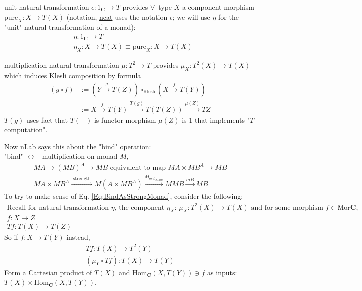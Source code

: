 \documentclass[10pt]{amsart}
\begin{document}
\begin{multicols*}{2}
unit natural transformation $\epsilon:1_{\mathbf{C}} \to T$ provides $\forall \,$ type $X$ a component morphism $\text{pure}_X :X \to T(X)$ (notation, \href{https://ncatlab.org/nlab/show/monad+%28in+computer+science%29}{ncat} uses the notation $\epsilon$; we will use $\eta$ for the "unit" natural transformation of a monad):
	\[
		\begin{aligned}
		&  \eta : 1_{\mathbf{C}} \to T \\ 
		& \eta_X : X\to T(X) \equiv \text{pure}_X : X \to T(X)
		\end{aligned}	
	\]

multiplication natural transformation $\mu :T^2 \to T$ provides $\mu_X : T^2(X) \to T(X)$ which induces Klesli composition by formula
\begin{equation}
\begin{aligned} 
	(g\circ f) & := (Y \xrightarrow{g} T(Z)) \circ_{\text{Klesli}} (X\xrightarrow{f} T(Y)) \\
	& := X \xrightarrow{f} T(Y) \xrightarrow{T(g)} T(T(Z)) \xrightarrow{ \mu(Z) } TZ
\end{aligned} 
\end{equation}
$T(g)$ uses fact that $T(-)$ is functor morphism $\mu(Z)$ is 1 that implements "$T$-computation".

Now \href{https://ncatlab.org/nlab/show/monad+%28in+computer+science%29}{nLab} says this about the "bind" operation: \\
	"bind" \quad $\leftrightarrow$ \, multiplication on monad $M$, \\
	\begin{equation}\label{Eq:BindAsStrongMonad}
	\begin{gathered} 
	MA \to (MB)^A \to MB \text{ equivalent to map } MA \times MB^A \to MB \\ 
	 MA \times MB^A \xrightarrow{ \text{ strength } } M(A\times MB^A) \xrightarrow{ M_{\text{eval}_{A, MB} } } MMB \xrightarrow{ mB } MB
	\end{gathered} 
	\end{equation}
To try to make sense of Eq. \ref{Eq:BindAsStrongMonad}, consider the following: 
\[
\begin{gathered}
\text{Recall for natural transformation $\eta$, the component $\eta_X$: } \mu_X : T^2(X) \to T(X) \text{ and for some morphism $f \in \text{Mor}{\mathbf{C}}$}, \\
	f:X\to Z \\
	Tf:T(X) \to T(Z)
\end{gathered} 
\]
So if $f:X\to T(Y)$ instead, 
\[
\begin{gathered}
Tf:T(X) \to T^2(Y) \\ 
(\mu_Y \circ Tf) : T(X) \to T(Y)
\end{gathered} 
\]
Form a Cartesian product of $T(X)$ and $\text{Hom}_{\mathbf{C}}(X,T(Y)) \ni f$ as inputs: $T(X) \times \text{Hom}_{\mathbf{C}}(X, T(Y))$. \\


\end{multicols*}
\end{document}
